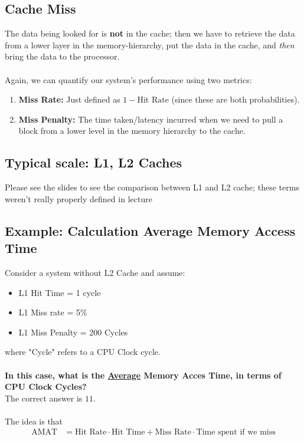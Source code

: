 \documentclass[11pt]{article}
\begin{document}
\subsection{Cache Miss}
The data being looked for is \textbf{not} in the cache; then we have to retrieve the data from a lower layer in the memory-hierarchy, put the data in the cache, and \emph{then} bring the data to the processor.
\\
\\
Again, we can quantify our system's performance using two metrics:
\begin{enumerate}
  \item \textbf{Miss Rate:} Just defined as $1-\text{Hit Rate}$ (since these are both probabilities).
  \item \textbf{Miss Penalty:} The time taken/latency incurred when we need to pull a block from a lower level in the memory hierarchy to the cache.
\end{enumerate}

\subsection{Typical scale: L1, L2 Caches}
\begin{note}
  {Please see the slides to see the comparison between L1 and L2 cache; these terms weren't really properly defined in lecture}
\end{note}

\vskip 1cm
\subsection*{Example: Calculation Average Memory Access Time}

Consider a system without L2 Cache and assume:
\begin{itemize}
  \item L1 Hit Time = 1 cycle
  \item L1 Miss rate = 5\%
  \item L1 Miss Penalty = 200 Cycles
\end{itemize} where "Cycle" refers to a CPU Clock cycle.
\\
\\
\textbf{In this case, what is the \underline{Average} Memory Acces Time, in terms of CPU Clock Cycles?}
\\
The correct answer is $11$. 
\\
\\
The idea is that 
\begin{align*}
  \mathrm{AMAT} &= \text{Hit Rate} \cdot \text{Hit Time} + \text{Miss Rate} \cdot \text{Time spent if we miss} \\
\end{align*}
\end{document}
